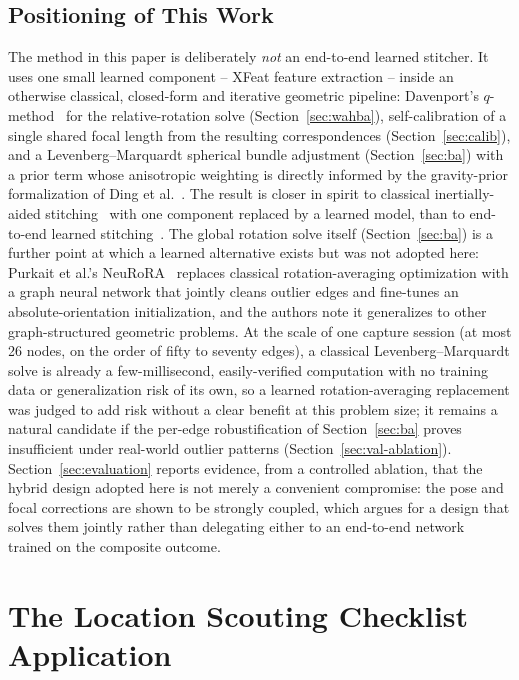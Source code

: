 \documentclass[11pt]{article}
\begin{document}
\subsection{Positioning of This Work}

The method in this paper is deliberately \emph{not} an end-to-end learned stitcher. It uses one small learned component -- XFeat feature extraction -- inside an otherwise classical, closed-form and iterative geometric pipeline: Davenport's $q$-method~\cite{markley1988attitude} for the relative-rotation solve (Section~\ref{sec:wahba}), self-calibration of a single shared focal length from the resulting correspondences (Section~\ref{sec:calib}), and a Levenberg--Marquardt spherical bundle adjustment (Section~\ref{sec:ba}) with a prior term whose anisotropic weighting is directly informed by the gravity-prior formalization of Ding et al.~\cite{ding2021gravity}. The result is closer in spirit to classical inertially-aided stitching~\cite{yang2011inertial,yaseen2023sensepanorama} with one component replaced by a learned model, than to end-to-end learned stitching~\cite{nie2021udis,nie2023udispp}. The global rotation solve itself (Section~\ref{sec:ba}) is a further point at which a learned alternative exists but was not adopted here: Purkait et al.'s NeuRoRA~\cite{purkait2020neurora} replaces classical rotation-averaging optimization with a graph neural network that jointly cleans outlier edges and fine-tunes an absolute-orientation initialization, and the authors note it generalizes to other graph-structured geometric problems. At the scale of one capture session (at most 26 nodes, on the order of fifty to seventy edges), a classical Levenberg--Marquardt solve is already a few-millisecond, easily-verified computation with no training data or generalization risk of its own, so a learned rotation-averaging replacement was judged to add risk without a clear benefit at this problem size; it remains a natural candidate if the per-edge robustification of Section~\ref{sec:ba} proves insufficient under real-world outlier patterns (Section~\ref{sec:val-ablation}). Section~\ref{sec:evaluation} reports evidence, from a controlled ablation, that the hybrid design adopted here is not merely a convenient compromise: the pose and focal corrections are shown to be strongly coupled, which argues for a design that solves them jointly rather than delegating either to an end-to-end network trained on the composite outcome.

\section{The Location Scouting Checklist Application}
\label{sec:app}
\end{document}
